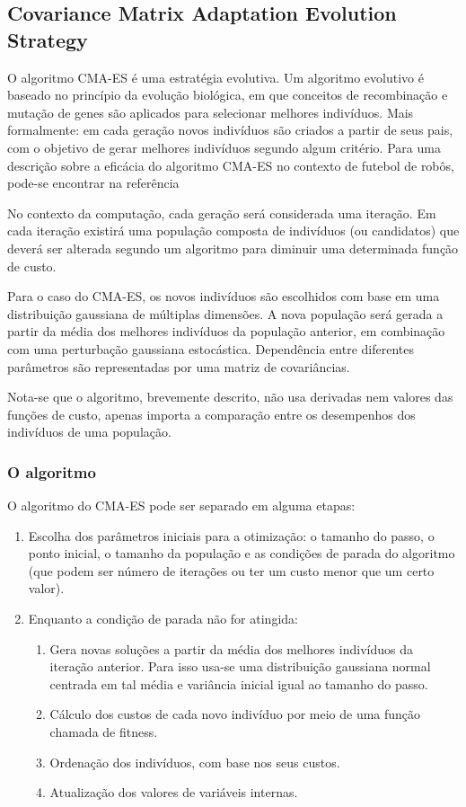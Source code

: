 \documentclass[10pt,fleqn,a4paper]{article}
\begin{document}
\subsection{Covariance Matrix Adaptation Evolution Strategy}

O algoritmo CMA-ES é uma estratégia evolutiva. Um algoritmo evolutivo é baseado no princípio da evolução biológica, em que conceitos de recombinação e mutação de genes são aplicados para selecionar melhores indivíduos. Mais formalmente: em cada geração novos indivíduos são criados a partir de seus pais, com o objetivo de gerar melhores indivíduos segundo algum critério. Para uma descrição sobre a eficácia do algoritmo CMA-ES no contexto de futebol de robôs, pode-se encontrar na referência \cite{CMA-ES-Soccer}

No contexto da computação, cada geração será considerada uma iteração. Em cada iteração existirá uma população composta de indivíduos (ou candidatos) que deverá ser alterada segundo um algoritmo para diminuir uma determinada função de custo. 

Para o caso do CMA-ES, os novos indivíduos são escolhidos com base em uma distribuição gaussiana de múltiplas dimensões. A nova população será gerada a partir da média dos melhores indivíduos da população anterior, em combinação com uma perturbação gaussiana estocástica. Dependência entre diferentes parâmetros são representadas por uma matriz de covariâncias.

Nota-se que o algoritmo, brevemente descrito, não usa derivadas nem valores das funções de custo, apenas importa a comparação entre os desempenhos dos indivíduos de uma população.

\subsubsection{O algoritmo}

O algoritmo do CMA-ES pode ser separado em alguma etapas:

\begin{enumerate}
\item Escolha dos parâmetros iniciais para a otimização: o tamanho do passo, o ponto inicial, o tamanho da população e as condições de parada do algoritmo (que podem ser número de iterações ou ter um custo menor que um certo valor).
\item Enquanto a condição de parada não for atingida:
\begin{enumerate}
\item Gera novas soluções a partir da média dos melhores indivíduos da iteração anterior. Para isso usa-se uma distribuição gaussiana normal centrada em tal média e variância inicial igual ao tamanho do passo.
\item Cálculo dos custos de cada novo indivíduo por meio de uma função chamada de fitness.
\item Ordenação dos indivíduos, com base nos seus custos.
\item Atualização dos valores de variáveis internas.
\end{enumerate}
\end{enumerate}
\end{document}
